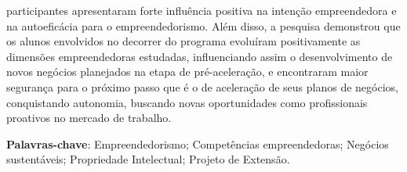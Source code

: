 \begin{resumo}
participantes apresentaram forte influência positiva na intenção empreendedora e na autoeficácia para o empreendedorismo. Além disso, a pesquisa demonstrou que os alunos envolvidos no decorrer do programa evoluíram positivamente as dimensões empreendedoras estudadas, influenciando assim o desenvolvimento de novos negócios planejados na etapa de pré-aceleração, e encontraram maior segurança para o próximo passo que é o de aceleração de seus planos de negócios, conquistando autonomia, buscando novas oportunidades como profissionais proativos no mercado de trabalho.

\textbf{Palavras-chave}: Empreendedorismo; Competências empreendedoras; Negócios sustentáveis; Propriedade Intelectual; Projeto de Extensão.
\end{resumo}